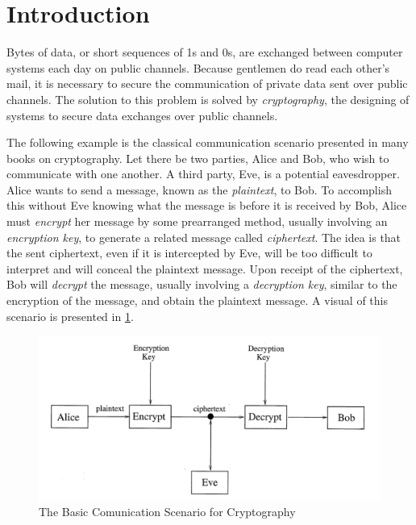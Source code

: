\section{Introduction}

\par Bytes of data, or short sequences of 1s and 0s, are exchanged between
computer systems each day on public channels. Because gentlemen do read each
other's mail, it is necessary to secure the communication of private data
sent over public channels. The solution to this problem is solved by
{\em cryptography}, the designing of systems to secure data exchanges over
public channels.

\par The following example is the classical communication scenario presented
in many books on cryptography. Let there be two parties, Alice and Bob, who
wish to communicate with one another. A third party, Eve, is a potential
eavesdropper. Alice wants to send a message, known as the {\em plaintext},
to Bob. To accomplish this without Eve knowing what the message is before it
is received by Bob, Alice must {\em encrypt} her message by some prearranged
method, usually involving an {\em encryption key}, to generate a related
message called {\em ciphertext}. The idea is that the sent ciphertext, even
if it is intercepted by Eve, will be too difficult to interpret and will
conceal the plaintext message. Upon receipt of the ciphertext, Bob will
{\em decrypt} the message, usually involving a {\em decryption key}, similar
to the encryption of the message, and obtain the plaintext message. A visual
of this scenario is presented in \ref{fig:basic-scenario}.

\begin{figure}[h!]\label{fig:basic-scenario}
  \centering
  \includegraphics[width=120mm]{figs/basic-scenario.png}
  \caption{The Basic Comunication Scenario for Cryptography
    \cite{bk:tw06}}
\end{figure}


